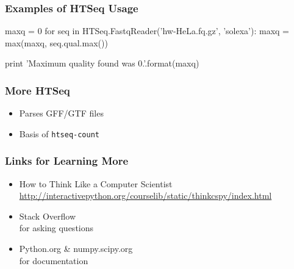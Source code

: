 \begin{frame}[fragile]
\frametitle{Examples of HTSeq Usage}

\begin{python}
maxq = 0
for seq in HTSeq.FastqReader('hw-HeLa.fq.gz', 'solexa'):
    maxq = max(maxq, seq.qual.max())

print 'Maximum quality found was {0}.'.format(maxq)
\end{python}

\end{frame}

\begin{frame}[fragile]
\frametitle{More HTSeq}
\begin{itemize}
\item Parses GFF/GTF files
\item Basis of \texttt{htseq-count}
\end{itemize}
\end{frame}

\begin{frame}[fragile]
\frametitle{Links for Learning More}

\begin{itemize}
\item How to Think Like a Computer Scientist
    \url{http://interactivepython.org/courselib/static/thinkcspy/index.html}
\item Stack Overflow \\
    for asking questions
\item Python.org \& numpy.scipy.org \\
    for documentation
\end{itemize}

\end{frame}



